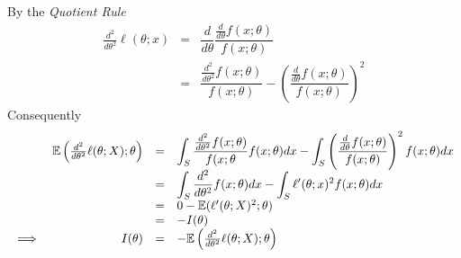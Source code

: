 \documentclass[11pt,a4paper]{article}
\begin{document}
By the \textit{Quotient Rule}
\[\begin{array}{rcl}
\frac{d^2}{d\theta^2}\ell(\theta;x)&=&\dfrac{d}{d\theta}\dfrac{\frac{d}{d\theta}f(x;\theta)}{f(x;\theta)}\\
&=&\dfrac{\frac{d^2}{d\theta^2}f(x;\theta)}{f(x;\theta)}-\left(\dfrac{\frac{d}{d\theta}f(x;\theta)}{f(x;\theta)}\right)^2
\end{array}\]
Consequently
\[\begin{array}{rrcl}
&\mathbb{E}\left(\frac{d^2}{d\theta^2}\ell(\theta;X);\theta\right)&=&{\displaystyle\int_S\frac{\frac{d^2}{d\theta^2}f(x;\theta)}{f(x;\theta}f(x;\theta)dx-\int_S\left(\frac{\frac{d}{d\theta}f(x;\theta)}{f(x;\theta)}\right)^2f(x;\theta)dx}\\
&&=&{\displaystyle\int_S\frac{d^2}{d\theta^2}f(x;\theta)dx-\int_S\ell'(\theta;x)^2f(x;\theta)dx}\\
&&=&0-\mathbb{E}(\ell'(\theta;X)^2;\theta)\\
&&=&-I(\theta)\\
\implies&I(\theta)&=&-\mathbb{E}\left(\frac{d^2}{d\theta^2}\ell(\theta;X);\theta\right)
\end{array}\]
\proved
\end{document}
